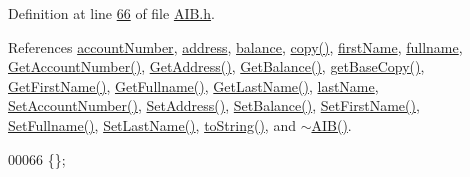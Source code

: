 Definition at line \hyperlink{_a_i_b_8h_source_l00066}{66} of file \hyperlink{_a_i_b_8h_source}{A\+I\+B.\+h}.



References \hyperlink{_a_i_b_8h_source_l00100}{account\+Number}, \hyperlink{_a_i_b_8h_source_l00102}{address}, \hyperlink{_a_i_b_8h_source_l00101}{balance}, \hyperlink{_a_i_b_8cpp_source_l00037}{copy()}, \hyperlink{_a_i_b_8h_source_l00098}{first\+Name}, \hyperlink{_a_i_b_8h_source_l00097}{fullname}, \hyperlink{_a_i_b_8cpp_source_l00081}{Get\+Account\+Number()}, \hyperlink{_a_i_b_8cpp_source_l00065}{Get\+Address()}, \hyperlink{_a_i_b_8cpp_source_l00073}{Get\+Balance()}, \hyperlink{_a_i_b_8cpp_source_l00024}{get\+Base\+Copy()}, \hyperlink{_a_i_b_8cpp_source_l00097}{Get\+First\+Name()}, \hyperlink{_a_i_b_8cpp_source_l00105}{Get\+Fullname()}, \hyperlink{_a_i_b_8cpp_source_l00089}{Get\+Last\+Name()}, \hyperlink{_a_i_b_8h_source_l00099}{last\+Name}, \hyperlink{_a_i_b_8cpp_source_l00077}{Set\+Account\+Number()}, \hyperlink{_a_i_b_8cpp_source_l00061}{Set\+Address()}, \hyperlink{_a_i_b_8cpp_source_l00069}{Set\+Balance()}, \hyperlink{_a_i_b_8cpp_source_l00093}{Set\+First\+Name()}, \hyperlink{_a_i_b_8cpp_source_l00101}{Set\+Fullname()}, \hyperlink{_a_i_b_8cpp_source_l00085}{Set\+Last\+Name()}, \hyperlink{_a_i_b_8cpp_source_l00056}{to\+String()}, and \hyperlink{_a_i_b_8cpp_source_l00017}{$\sim$\+A\+I\+B()}.


\begin{DoxyCode}
00066 \{\};
\end{DoxyCode}


